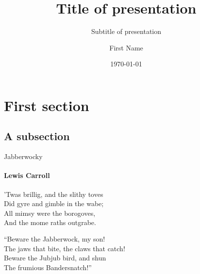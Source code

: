 \documentclass[aspectratio=169]{beamer}
\author[Name]{First Name}
\title{Title of presentation}
\subtitle{Subtitle of presentation}
\institute[HBRS]{Hochschule Bonn-Rhein-Sieg}
\date{\today}
\begin{document}
{
\begin{frame}
\titlepage
\end{frame}
}


\section{First section}
\subsection{A subsection}

\begin{frame}{Jabberwocky}
      \framesubtitle{Lewis Carroll}%
      'Twas brillig, and the slithy toves\\
      Did gyre and gimble in the wabe;\\
      All mimsy were the borogoves,\\
      And the mome raths outgrabe.\\\bigskip

      “Beware the Jabberwock, my son!\\
      The jaws that bite, the claws that catch!\\
      Beware the Jubjub bird, and shun\\
      The frumious Bandersnatch!”\\
\end{frame}
\end{document}

